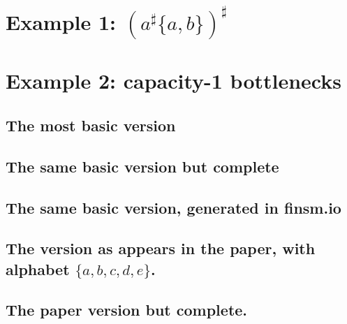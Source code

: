 \documentclass{article}
\begin{document}
\section{Example 1: $(a^\sharp\{a,b\})^\sharp$} 
%
 



\section{Example 2: capacity-1 bottlenecks}

\subsection{The most basic version}
 

\subsection{The same basic version but complete}
 

\subsection{The same basic version, generated in finsm.io}
 

\subsection{The version as appears in the paper, with alphabet $\{a,b,c,d,e\}$.}
 

\subsection{The paper version but complete.}
 
\end{document}
